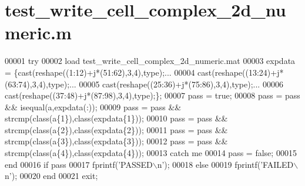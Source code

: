 \hypertarget{test__write__cell__complex__2d__numeric_8m_source}{}\section{test\+\_\+write\+\_\+cell\+\_\+complex\+\_\+2d\+\_\+numeric.\+m}
\label{test__write__cell__complex__2d__numeric_8m_source}

\begin{DoxyCode}
00001 \textcolor{keywordflow}{try}
00002     load test\_write\_cell\_complex\_2d\_numeric.mat
00003     expdata = \{cast(reshape((1:12)+j*(51:62),3,4),type);...
00004                cast(reshape((13:24)+j*(63:74),3,4),type);...
00005                cast(reshape((25:36)+j*(75:86),3,4),type);...
00006                cast(reshape((37:48)+j*(87:98),3,4),type);\};
00007     pass = \textcolor{keyword}{true};
00008     pass = pass && isequal(a,expdata(:));
00009     pass = pass && strcmp(\textcolor{keyword}{class}(a\{1\}),\textcolor{keyword}{class}(expdata\{1\}));
00010     pass = pass && strcmp(\textcolor{keyword}{class}(a\{2\}),\textcolor{keyword}{class}(expdata\{2\}));
00011     pass = pass && strcmp(\textcolor{keyword}{class}(a\{3\}),\textcolor{keyword}{class}(expdata\{3\}));
00012     pass = pass && strcmp(\textcolor{keyword}{class}(a\{4\}),\textcolor{keyword}{class}(expdata\{4\}));
00013 \textcolor{keywordflow}{catch} me
00014     pass = \textcolor{keyword}{false};
00015 end
00016 \textcolor{keywordflow}{if} pass
00017     fprintf(\textcolor{stringliteral}{'PASSED\(\backslash\)n'});
00018 \textcolor{keywordflow}{else}
00019     fprintf(\textcolor{stringliteral}{'FAILED\(\backslash\)n'});
00020 end
00021 exit;
\end{DoxyCode}
